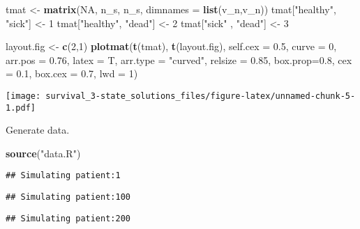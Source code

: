 \documentclass[
]{article}
\newenvironment{Shaded}{\begin{snugshade}}{\end{snugshade}}
\newcommand{\DataTypeTok}[1]{\textcolor[rgb]{0.13,0.29,0.53}{#1}}
\newcommand{\DecValTok}[1]{\textcolor[rgb]{0.00,0.00,0.81}{#1}}
\newcommand{\FloatTok}[1]{\textcolor[rgb]{0.00,0.00,0.81}{#1}}
\newcommand{\KeywordTok}[1]{\textcolor[rgb]{0.13,0.29,0.53}{\textbf{#1}}}
\newcommand{\NormalTok}[1]{#1}
\newcommand{\OtherTok}[1]{\textcolor[rgb]{0.56,0.35,0.01}{#1}}
\newcommand{\StringTok}[1]{\textcolor[rgb]{0.31,0.60,0.02}{#1}}
\begin{document}
\begin{Shaded}
\begin{Highlighting}[]
\NormalTok{tmat <-}\StringTok{ }\KeywordTok{matrix}\NormalTok{(}\OtherTok{NA}\NormalTok{, n_s, n_s, }\DataTypeTok{dimnames =} \KeywordTok{list}\NormalTok{(v_n,v_n))}
\NormalTok{tmat[}\StringTok{"healthy"}\NormalTok{, }\StringTok{"sick"}\NormalTok{]  <-}\StringTok{ }\DecValTok{1}
\NormalTok{tmat[}\StringTok{"healthy"}\NormalTok{, }\StringTok{"dead"}\NormalTok{]  <-}\StringTok{ }\DecValTok{2}
\NormalTok{tmat[}\StringTok{"sick"}\NormalTok{   , }\StringTok{"dead"}\NormalTok{]  <-}\StringTok{ }\DecValTok{3}

\NormalTok{layout.fig <-}\StringTok{ }\KeywordTok{c}\NormalTok{(}\DecValTok{2}\NormalTok{,}\DecValTok{1}\NormalTok{)}
\KeywordTok{plotmat}\NormalTok{(}\KeywordTok{t}\NormalTok{(tmat), }\KeywordTok{t}\NormalTok{(layout.fig), }\DataTypeTok{self.cex =} \FloatTok{0.5}\NormalTok{, }\DataTypeTok{curve =} \DecValTok{0}\NormalTok{, }\DataTypeTok{arr.pos =} \FloatTok{0.76}\NormalTok{,  }
        \DataTypeTok{latex =}\NormalTok{ T, }\DataTypeTok{arr.type =} \StringTok{"curved"}\NormalTok{, }\DataTypeTok{relsize =} \FloatTok{0.85}\NormalTok{, }\DataTypeTok{box.prop=}\FloatTok{0.8}\NormalTok{, }
        \DataTypeTok{cex =} \FloatTok{0.1}\NormalTok{, }\DataTypeTok{box.cex =} \FloatTok{0.7}\NormalTok{, }\DataTypeTok{lwd =} \DecValTok{1}\NormalTok{)}
\end{Highlighting}
\end{Shaded}

\texttt{[image: survival\_3-state\_solutions\_files/figure-latex/unnamed-chunk-5-1.pdf]}

Generate data.

\begin{Shaded}
\begin{Highlighting}[]
\KeywordTok{source}\NormalTok{(}\StringTok{"data.R"}\NormalTok{)}
\end{Highlighting}
\end{Shaded}

\begin{verbatim}
## Simulating patient:1
\end{verbatim}

\begin{verbatim}
## Simulating patient:100
\end{verbatim}

\begin{verbatim}
## Simulating patient:200
\end{verbatim}
\end{document}
